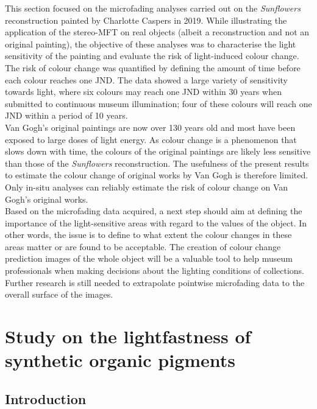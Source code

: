 This section focused on the microfading analyses carried out on the \textit{Sunflowers} reconstruction painted by Charlotte Caspers in 2019. While illustrating the application of the stereo-MFT on real objects (albeit a reconstruction and not an original painting), the objective of these analyses was to characterise the light sensitivity of the painting and evaluate the risk of light-induced colour change. The risk of colour change was quantified by defining the amount of time before each colour reaches one \gls{JND}. The data showed a large variety of sensitivity towards light, where six colours may reach one \gls{JND} within 30 years when submitted to continuous museum illumination; four of these colours will reach one \gls{JND} within a period of 10 years. \\

Van Gogh's original paintings are now over 130 years old and most have been exposed to large doses of light energy. As colour change is a phenomenon that slows down with time, the colours of the original paintings are likely less sensitive than those of the \textit{Sunflowers} reconstruction. The usefulness of the present results to estimate the colour change of original works by Van Gogh is therefore limited. Only in-situ analyses can reliably estimate the risk of colour change on Van Gogh’s original works.\\

Based on the microfading data acquired, a next step should aim at defining the importance of the light-sensitive areas with regard to the values of the object. In other words, the issue is to define to what extent the colour changes in these areas matter or are found to be acceptable. The creation of colour change prediction images of the whole object will be a valuable tool to help museum professionals when making decisions about the lighting conditions of collections. Further research is still needed to extrapolate pointwise microfading data to the overall surface of the images. \\



\newpage

\section{Study on the lightfastness of synthetic organic pigments}

\subsection{Introduction}


